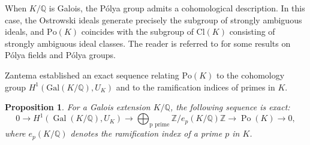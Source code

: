 \documentclass{jams-l}
\newtheorem{proposition}[theorem]{Proposition}
\theoremstyle{definition}
\theoremstyle{remark}
\numberwithin{equation}{section}
\DeclareMathOperator{\Po}{Po}
\DeclareMathOperator{\Gal}{Gal}
\begin{document}
When $K/\mathbb{Q}$ is Galois, the P\'olya group admits a cohomological description.
In this case, the Ostrowski ideals generate precisely the subgroup of strongly
ambiguous ideals, and $\mathrm{Po}(K)$ coincides with the subgroup of
$\mathrm{Cl}(K)$ consisting of strongly ambiguous ideal classes. The reader is referred to \cite{ChabertI,  Leriche 2013, MaarefJNT2021} for some results on P\'olya fields and P\'olya groups.

Zantema \cite{Zantema} established an exact sequence relating $\mathrm{Po}(K)$
to the cohomology group $H^{1}(\mathrm{Gal}(K/\mathbb{Q}),U_K)$ and to the
ramification indices of primes in $K$.

\begin{proposition}\cite[Proposition 3.1]{Zantema} \label{proposition, Zantema's exact sequence}
	For a Galois extension $K/\mathbb{Q}$, the following sequence is exact:
	\begin{equation} \label{equation, Zantema exact sequence}
	0 \longrightarrow H^1(\Gal(K/\mathbb{Q}),U_K) \longrightarrow \bigoplus _{\text{p prime}} \mathbb{Z} / e_p(K/\mathbb{Q}) \mathbb{Z} \longrightarrow \Po(K) \longrightarrow 0,
	\end{equation}
	where $e_p(K/\mathbb{Q})$ denotes the ramification index of a prime $p$ in $K$.
\end{proposition}
\end{document}
